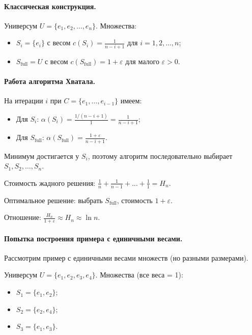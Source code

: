 \documentclass[12pt]{article}
\begin{document}
  \paragraph{Классическая конструкция.}
  Универсум \(U = \{e_1, e_2, \ldots, e_n\}\). Множества:
  \begin{itemize}
    \item \(S_i = \{e_i\}\) с весом \(c(S_i) = \frac{1}{n-i+1}\) для \(i = 1, 2, \ldots, n\);
    \item \(S_{\text{full}} = U\) с весом \(c(S_{\text{full}}) = 1 + \varepsilon\) для малого \(\varepsilon > 0\).
  \end{itemize}

  \paragraph{Работа алгоритма Хватала.}
  На итерации \(i\) при \(C = \{e_1, \ldots, e_{i-1}\}\) имеем:
  \begin{itemize}
    \item Для \(S_i\): \(\alpha(S_i) = \frac{1/(n-i+1)}{1} = \frac{1}{n-i+1}\);
    \item Для \(S_{\text{full}}\): \(\alpha(S_{\text{full}}) = \frac{1+\varepsilon}{n-i+1}\).
  \end{itemize}
  Минимум достигается у \(S_i\), поэтому алгоритм последовательно выбирает \(S_1, S_2, \ldots, S_n\).

  Стоимость жадного решения: \(\frac{1}{n} + \frac{1}{n-1} + \ldots + \frac{1}{1} = H_n\).

  Оптимальное решение: выбрать \(S_{\text{full}}\), стоимость \(1 + \varepsilon\).

  Отношение: \(\frac{H_n}{1+\varepsilon} \approx H_n \approx \ln n\).

  \paragraph{Попытка построения примера с единичными весами.}
  Рассмотрим пример с единичными весами множеств (но разными размерами).

  Универсум \(U = \{e_1, e_2, e_3, e_4\}\). Множества (все веса = 1):
  \begin{itemize}
    \item \(S_1 = \{e_1, e_2\}\);
    \item \(S_2 = \{e_2, e_4\}\);
    \item \(S_3 = \{e_1, e_3\}\).
  \end{itemize}
\end{document}
